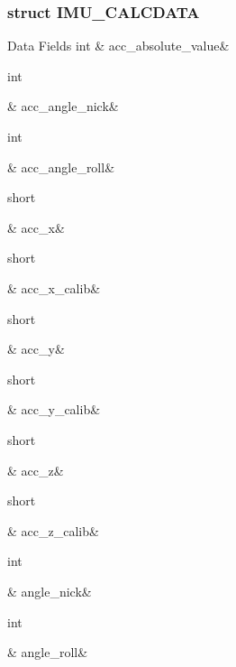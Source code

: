 \subsubsection{struct I\-M\-U\-\_\-\-C\-A\-L\-C\-D\-A\-T\-A}
\begin{DoxyFields}{Data Fields}
\hypertarget{a00004_a7676f09585cd44b4491a741080f5144f}{int}\label{a00004_a7676f09585cd44b4491a741080f5144f}
&
acc\-\_\-absolute\-\_\-value&
\\
\hline

\hypertarget{a00004_ac0830d448e4d20a04c32b09130494773}{int}\label{a00004_ac0830d448e4d20a04c32b09130494773}
&
acc\-\_\-angle\-\_\-nick&
\\
\hline

\hypertarget{a00004_a874e0348826b70ca9216fc511d452d39}{int}\label{a00004_a874e0348826b70ca9216fc511d452d39}
&
acc\-\_\-angle\-\_\-roll&
\\
\hline

\hypertarget{a00004_a7fbb77671df053d84528cbea2382e592}{short}\label{a00004_a7fbb77671df053d84528cbea2382e592}
&
acc\-\_\-x&
\\
\hline

\hypertarget{a00004_a0650341698626bafda8a1ab5a56c3295}{short}\label{a00004_a0650341698626bafda8a1ab5a56c3295}
&
acc\-\_\-x\-\_\-calib&
\\
\hline

\hypertarget{a00004_a770deedc041beaba300bef47cb3a38a4}{short}\label{a00004_a770deedc041beaba300bef47cb3a38a4}
&
acc\-\_\-y&
\\
\hline

\hypertarget{a00004_abe02bf64056f97d29007aad7e3d88fa0}{short}\label{a00004_abe02bf64056f97d29007aad7e3d88fa0}
&
acc\-\_\-y\-\_\-calib&
\\
\hline

\hypertarget{a00004_ae7846339ad41e5bb0fec5dd122604db4}{short}\label{a00004_ae7846339ad41e5bb0fec5dd122604db4}
&
acc\-\_\-z&
\\
\hline

\hypertarget{a00004_a424a693d153b5d8e1d1fc7a79aaaecaf}{short}\label{a00004_a424a693d153b5d8e1d1fc7a79aaaecaf}
&
acc\-\_\-z\-\_\-calib&
\\
\hline

\hypertarget{a00004_a02e2b78d44d14ab230a5fdd1f8a61dc6}{int}\label{a00004_a02e2b78d44d14ab230a5fdd1f8a61dc6}
&
angle\-\_\-nick&
\\
\hline

\hypertarget{a00004_a700c1f6bb0b98b4f44a4086502236d41}{int}\label{a00004_a700c1f6bb0b98b4f44a4086502236d41}
&
angle\-\_\-roll&
\\
\hline


\end{DoxyFields}
